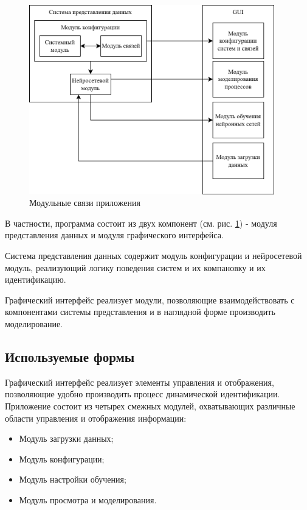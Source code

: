 \begin{figure}[H]
  \begin{center}
    \includegraphics[width=0.95\textwidth]{figures/modules/relations.png}
  \end{center}
  \caption{Модульные связи приложения}\label{fig:modules:relation}
\end{figure}

В частности, программа состоит из двух компонент (см. рис.
\ref{fig:modules:relation}) - модуля представления данных и модуля графического
интерфейса. 

Система представления данных содержит модуль конфигурации и нейросетевой
модуль, реализующий логику поведения систем и их компановку и их идентификацию.

Графический интерфейс реализует модули, позволяющие взаимодействовать с
компонентами системы представления и в наглядной форме производить
моделирование. 

\subsection{Используемые формы}

Графический интерфейс реализует элементы управления и отображения, позволяющие
удобно производить процесс динамической идентификации. Приложение состоит из
четырех смежных модулей, охватывающих различные области управления и
отображения информации:

\begin{itemize}
  \item Модуль загрузки данных;
  \item Модуль конфигурации;
  \item Модуль настройки обучения;
  \item Модуль просмотра и моделирования.
\end{itemize}

